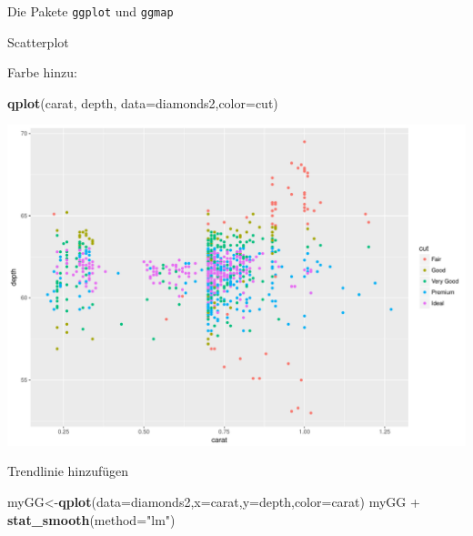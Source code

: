\documentclass[ignorenonframetext,]{beamer}
\newenvironment{Shaded}{}{}
\newcommand{\KeywordTok}[1]{\textcolor[rgb]{0.00,0.44,0.13}{\textbf{{#1}}}}
\newcommand{\DataTypeTok}[1]{\textcolor[rgb]{0.56,0.13,0.00}{{#1}}}
\newcommand{\StringTok}[1]{\textcolor[rgb]{0.25,0.44,0.63}{{#1}}}
\newcommand{\NormalTok}[1]{{#1}}
\begin{document}
\begin{frame}[fragile]{Die Pakete \texttt{ggplot} und \texttt{ggmap}}
\begin{block}{Scatterplot}
\end{block}

\begin{block}{Farbe hinzu:}

\begin{Shaded}
\begin{Highlighting}[]
\KeywordTok{qplot}\NormalTok{(carat, depth, }\DataTypeTok{data=}\NormalTok{diamonds2,}\DataTypeTok{color=}\NormalTok{cut)}
\end{Highlighting}
\end{Shaded}

\includegraphics{R_intern_files/figure-beamer/unnamed-chunk-242-1.pdf}

\end{block}

\begin{block}{Trendlinie hinzufügen}

\begin{Shaded}
\begin{Highlighting}[]
\NormalTok{myGG<-}\KeywordTok{qplot}\NormalTok{(}\DataTypeTok{data=}\NormalTok{diamonds2,}\DataTypeTok{x=}\NormalTok{carat,}\DataTypeTok{y=}\NormalTok{depth,}\DataTypeTok{color=}\NormalTok{carat) }
\NormalTok{myGG +}\StringTok{ }\KeywordTok{stat_smooth}\NormalTok{(}\DataTypeTok{method=}\StringTok{"lm"}\NormalTok{)}
\end{Highlighting}
\end{Shaded}


\end{block}
\end{frame}
\end{document}
